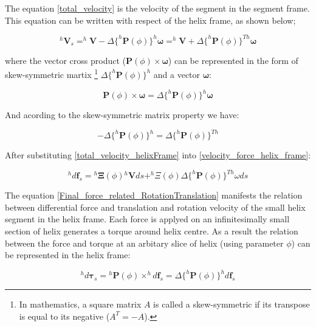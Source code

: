\documentclass[12pt,a4paper,titlepage]{report}
\begin{document}
The equation \ref{total_velocity} is the velocity of the segment in the segment frame. 
This equation can be written with respect of the helix frame, as shown below;

\begin{equation}
^{h}\bm{V}_s = ^{h}\bm{V} - \Delta{\{^{h}\bm{P}(\phi)}\}^{h}\bm{\omega} = ^{h}\bm{V} + \Delta{\{^{h}\bm{P}(\phi)}\}^{Th}\bm{\omega}
\label{total_velocity_helixFrame}
\end{equation}

where the vector cross product (${\bm{P}(\phi)}\times{\bm{\omega}}$) can be represented in the form 
of skew-symmetric
martix \footnote{In mathematics, a square matrix $A$ is called a skew-symmetric if its transpose
is equal to its negative ($A^{T} = -A$).} $\Delta{\{^{h}\bm{P}(\phi)}\}^{h}$ and a vector
$\bm{\omega}$:

\begin{equation}
{\bm{P}(\phi)}\times{\bm{\omega}} = \Delta{\{^{h}\bm{P}(\phi)}\}^{h}{\bm{\omega}}
\label{cross_product}
\end{equation}

And acording to the skew-symmetric matrix property we have:

\begin{equation}
-\Delta{\{^{h}\bm{P}(\phi)}\}^{h} = \Delta{\{^{h}\bm{P}(\phi)}\}^{Th}
\label{skew_symetric_vector}
\end{equation}

After substituting \ref{total_velocity_helixFrame} into \ref{velocity_force_helix_frame}:

\begin{equation}
 ^{h}d\bm{f}_s = {^{h}\bm{\Xi}}(\phi){^{h}\bm{V}}{ds} + ^{h}\Xi(\phi)\Delta{\{^{h}\bm{P}(\phi)}\}^{Th}\omega{ds}
\label{Final_force_related_RotationTranslation}
\end{equation}

The equation \ref{Final_force_related_RotationTranslation} manifests the relation between differential force
and translation and rotation velocity of the small helix segment in the helix frame. Each force is applyed on 
an infinitesimally small section of helix generates a torque around helix centre. As a result the 
relation between the force and torque at an arbitary slice of helix (using parameter $\phi$) can be 
represented in the helix frame:

\begin{equation}
 ^{h}d\bm{\tau}_s = {^{h}\bm{P}(\phi)} \times ^{h}d\bm{f}_s=\Delta{\{^{h}\bm{P}(\phi)}\}^{h}{d\bm{f}_s}
\label{forceTorque_relation_helixFrame}
\end{equation}
\end{document}
